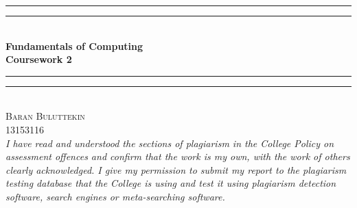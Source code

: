 \documentclass[12pt]{article}
\begin{document}
    \begin{titlepage}
        \begin{center}
            \vspace*{.06\textheight}{\scshape\LARGE Birkbeck, University of London\par}\vspace{1.5cm} %
            \rule[0.5ex]{\linewidth}{2pt}\vspace*{-\baselineskip}\vspace*{3.2pt}
            \rule[0.5ex]{\linewidth}{1pt}\\[\baselineskip]
            \huge{\bfseries Fundamentals of Computing\\Coursework 2}\\[4mm]
            \rule[0.5ex]{\linewidth}{1pt}\vspace*{-\baselineskip}\vspace{3.2pt}
            \rule[0.5ex]{\linewidth}{2pt}\\
            [2.5cm]
        
            \textsc{\Large Baran Buluttekin\\13153116}\\
            [1.5cm]
            \large \textit{ I have read and understood the sections of plagiarism in the College Policy on assessment offences and confirm that the work is my own, with the work of others clearly acknowledged. I give my permission to submit my report to the plagiarism testing database that the College is using and test it using plagiarism detection software, search engines or meta-searching software.}


        \end{center}
    \end{titlepage}
\end{document}

